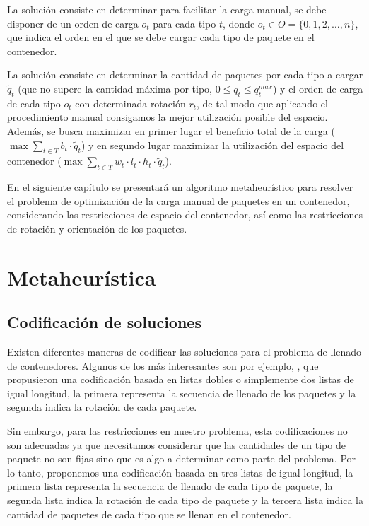 \documentclass[openany]{article}
\begin{document}
La solución consiste en determinar para facilitar la carga manual, se debe disponer de un orden de carga $o_t$ para cada tipo $t$, donde $o_t \in O = \{0, 1, 2, \ldots, n\}$, que indica el orden en el que se debe cargar cada tipo de paquete en el contenedor.

La solución consiste en determinar la cantidad de paquetes por cada tipo a cargar $\tilde{q}_t$ (que no supere la cantidad máxima por tipo, $0 \leq \tilde{q}_t \leq q^{max}_t$) y el orden de carga de cada tipo $o_t$ con determinada rotación $r_t$, de tal modo que aplicando el procedimiento manual consigamos la mejor utilización posible del espacio. Además, se busca maximizar en primer lugar el beneficio total de la carga ($\max \sum_{t \in T} b_t \cdot \tilde{q}_t$) y en segundo lugar maximizar la utilización del espacio del contenedor ($\max \sum_{t \in T} w_t \cdot l_t \cdot h_t \cdot \tilde{q}_t$).

En el siguiente capítulo se presentará un algoritmo metaheurístico para resolver el problema de optimización de la carga manual de paquetes en un contenedor, considerando las restricciones de espacio del contenedor, así como las restricciones de rotación y orientación de los paquetes.








\newpage








\section{Metaheurística}

\subsection{Codificación de soluciones}
\label{sec:codificacion}

Existen diferentes maneras de codificar las soluciones para el problema de llenado de contenedores. Algunos de los más interesantes son por ejemplo, \textcite{GEHRING1997401}, que propusieron una codificación basada en listas dobles o simplemente dos listas de igual longitud, la primera representa la secuencia de llenado de los paquetes y la segunda indica la rotación de cada paquete.

Sin embargo, para las restricciones en nuestro problema, esta codificaciones no son adecuadas ya que necesitamos considerar que las cantidades de un tipo de paquete no son fijas sino que es algo a determinar como parte del problema. Por lo tanto, proponemos una codificación basada en tres listas de igual longitud, la primera lista representa la secuencia de llenado de cada tipo de paquete, la segunda lista indica la rotación de cada tipo de paquete y la tercera lista indica la cantidad de paquetes de cada tipo que se llenan en el contenedor.
\end{document}
